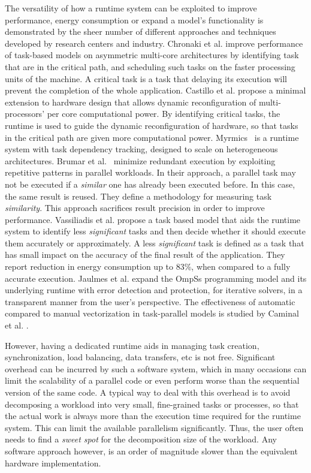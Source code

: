 The versatility of how a runtime system can be exploited to improve
performance, energy consumption or expand a model's functionality is
demonstrated by the sheer number of different approaches and techniques
developed by research centers and industry.  Chronaki et al. \cite{7762236}
improve performance of task-based models on asymmetric multi-core architectures
by identifying task that are in the critical path, and scheduling such tasks on
the faster processing units of the machine.  A critical task is a task that
delaying its execution will prevent the completion of the whole application.
Castillo et al. \cite{7516037} propose a minimal extension to hardware design
that allows dynamic reconfiguration of multi-processors' per core
computational power.  By identifying critical tasks, the runtime is used to
guide the dynamic reconfiguration of hardware, so that tasks in the critical
path are given more computational power.
Myrmics~\cite{DBLP:journals/corr/LyberisPMN16} is a runtime system with task
dependency tracking, designed to scale on heterogeneous architectures.  Brumar
et al.~\cite{7967204} minimize redundant execution by exploiting repetitive
patterns in parallel workloads.  In their approach, a parallel task may not be
executed if a \emph{similar} one has already been executed before.  In this
case, the same result is reused.  They define a methodology for measuring task
\emph{similarity}.  This approach sacrifices result precision in order to improve
performance.  Vassiliadis et al. \cite{Vassiliadis:2015:PMR:2688500.2688546}
propose a task based model that aids the runtime system to identify less
\emph{significant} tasks and then decide whether it should execute them
accurately or approximately.  A less \emph{significant} task is defined as a task
that has small impact on the accuracy of the final result of the application.
They report reduction in energy consumption up to 83\%, when compared to a
fully accurate execution.  Jaulmes et al.  \cite{7832827}
expand the OmpSs programming model and its underlying runtime with error detection and
protection, for iterative solvers, in a transparent manner from the user's
perspective.  The effectiveness of automatic compared to manual vectorization in
task-parallel models is studied by Caminal et al. \cite{helenaArticle}.  

However, having a dedicated runtime aids in managing task creation,
synchronization, load balancing, data transfers, etc is not free.  Significant
overhead can be incurred by such a software system, which in many occasions can
limit the scalability of a parallel code or even perform worse than the
sequential version of the same code.  A typical way to deal with this overhead
is to avoid decomposing a workload into very small, fine-grained tasks or
processes, so that the actual work is always more than the execution time
required for the runtime system.  This can limit the available
parallelism significantly. Thus, the user often needs to find a
\emph{sweet spot} for the decomposition size of the workload.  Any software
approach however, is an order of magnitude slower than the equivalent hardware
implementation.

